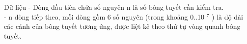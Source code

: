 Dữ liệu
- Dòng đầu tiên chứa số nguyên n là số bông tuyết cần kiểm tra.   
\\   - n dòng tiếp theo, mỗi dòng gồm 6 số nguyên (trong khoảng 0..10   $^    7   $   ) là độ dài các cánh của bông tuyết tương ứng, được liệt kê theo thứ tự vòng quanh bông tuyết.